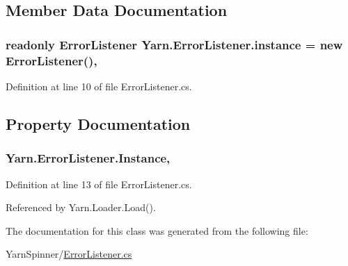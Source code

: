 \subsection{Member Data Documentation}
\hypertarget{a00090_a9421873edea84c51d5905f5a24c62479}{
\subsubsection[{instance}]{\setlength{\rightskip}{0pt plus 5cm}readonly {\bf Error\-Listener} Yarn.\-Error\-Listener.\-instance = new {\bf Error\-Listener}()\hspace{0.3cm}{\ttfamily [static]}, {\ttfamily [private]}}}\label{a00090_a9421873edea84c51d5905f5a24c62479}


Definition at line 10 of file Error\-Listener.\-cs.



\subsection{Property Documentation}
\hypertarget{a00090_a47b8f4f1d414afa1ea6067218c7ee34d}{
\subsubsection[{Instance}]{ Yarn.\-Error\-Listener.\-Instance\hspace{0.3cm}{\ttfamily [static]}, {\ttfamily [get]}}}\label{a00090_a47b8f4f1d414afa1ea6067218c7ee34d}


Definition at line 13 of file Error\-Listener.\-cs.



Referenced by Yarn.\-Loader.\-Load().



The documentation for this class was generated from the following file\-:\begin{DoxyCompactItemize}
\item 
Yarn\-Spinner/\hyperlink{a00291}{Error\-Listener.\-cs}\end{DoxyCompactItemize}
